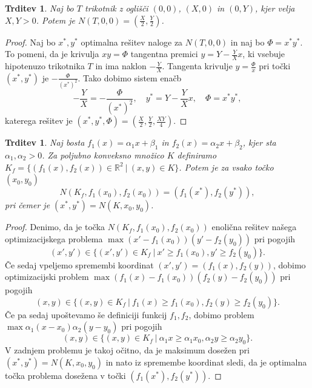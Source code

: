 \documentclass[10pt, a4paper]{article}
\newtheorem{trditev}[izr]{Trditev}
\newenvironment{noticeC}{%
  \tcolorbox[%
  notitle,
  empty,
  enhanced,  %
  breakable,
  coltext=black, 
  fontupper=\rmfamily,
  noparskip,
  sharp corners,
  boxrule=-1pt,  %
  frame hidden,
  left=7pt,  %
  right=7pt,
  top=5pt,
  bottom=5pt,
  before skip=2.5ex plus 2pt,
  after skip=2.5ex plus 2pt,
  overlay unbroken and last={%
  },
  ]}
{\endtcolorbox}
\newenvironment{dokaz}%
  {\begin{noticeC}\begin{proof}}%
  {\end{proof}\end{noticeC}}
\newcommand{\R}{\mathbb {R}}
\begin{document}
\begin{trditev}\label{trd:1}
  Naj bo $T$ trikotnik z oglišči $(0, 0)$, $(X, 0)$ in $(0, Y)$,
  kjer velja $X, Y > 0$. Potem je $N(T, 0, 0) = \left(\frac{X}{2}, \frac{Y}{2}\right)$.
\end{trditev}

\begin{dokaz}
  Naj bo $x^*, y^*$ optimalna rešitev naloge za $N(T, 0, 0)$
  in naj bo $\Phi = x^* y^*$. To pomeni, da je krivulja $xy = \Phi$ tangentna premici 
  $y = Y - \frac{Y}{X}x$, ki vsebuje hipotenuzo trikotnika $T$ in 
  ima naklon $-\frac{Y}{X}$. Tangenta krivulje $y = \frac{\Phi}{x}$
  pri točki $(x^*, y^*)$ je $-\frac{\Phi}{(x^*)^2}$.
  Tako dobimo sistem enačb 
  $$-\frac{Y}{X} = - \frac{\Phi}{(x^*)^2},\quad y^* = Y - \frac{Y}{X} x,\quad \Phi = x^* y^*,$$
  katerega rešitev je $(x^*, y^*, \Phi) = \left(\frac{X}{2}, \frac{Y}{2}, \frac{XY}{4}\right)$.
\end{dokaz}

\begin{trditev}\label{trd:2}
  Naj bosta $f_1 (x) = \alpha_1 x + \beta_1$ in $f_2 (x) = \alpha_2 x + \beta_2$,
  kjer sta $\alpha_1, \alpha_2 > 0$.
  Za poljubno konveksno množico $K$
  definiramo $K_f = \{(f_1 (x), f_2 (x))\in \R^2\ |\ (x, y) \in K\}$.
  Potem je za vsako točko $(x_0, y_0)$
  $$N(K_f, f_1(x_0), f_2 (x_0)) = (f_1 (x^*), f_2 (y^*)),$$
  pri čemer je $(x^*, y^*) = N(K, x_0, y_0)$.
\end{trditev}

\begin{dokaz}
  Denimo, da je točka $N (K_f, f_1(x_0), f_2 (x_0))$ enolična rešitev našega optimizacijskega problema 
  $\max (x' - f_1 (x_0)) (y' - f_2(y_0))$ pri pogojih 
  $$(x', y') \in \{(x', y') \in K_f\ |\ x' \geq f_1 (x_0), y' \geq f_2 (y_0)\}.$$
  Če sedaj vpeljemo spremembi koordinat $(x', y') = (f_1 (x), f_2 (y))$, dobimo optimizacijski problem
  $\max (f_1(x) - f_1 (x_0)) (f_2(y) - f_2(y_0))$ pri pogojih 
  $$(x, y) \in \{(x, y) \in K_f\ |\ f_1(x) \geq f_1 (x_0), f_2(y) \geq f_2 (y_0)\}.$$
  Če pa sedaj upoštevamo še definiciji funkcij $f_1, f_2$, dobimo problem 
  $\max \alpha_1 (x -x_0) \alpha_2(y - y_0)$ pri pogojih 
  $$(x, y) \in \{(x, y) \in K_f\ |\ \alpha_1 x \geq \alpha_1 x_0, \alpha_2 y \geq \alpha_2 y_0\}.$$
  V zadnjem problemu je takoj očitno, da je maksimum dosežen pri $(x^*, y^*) = N(K, x_0, y_0)$
  in nato iz spremembe koordinat sledi, da je optimalna točka problema dosežena v točki 
  $(f_1(x^*), f_2(y^*))$.
\end{dokaz}
\end{document}
